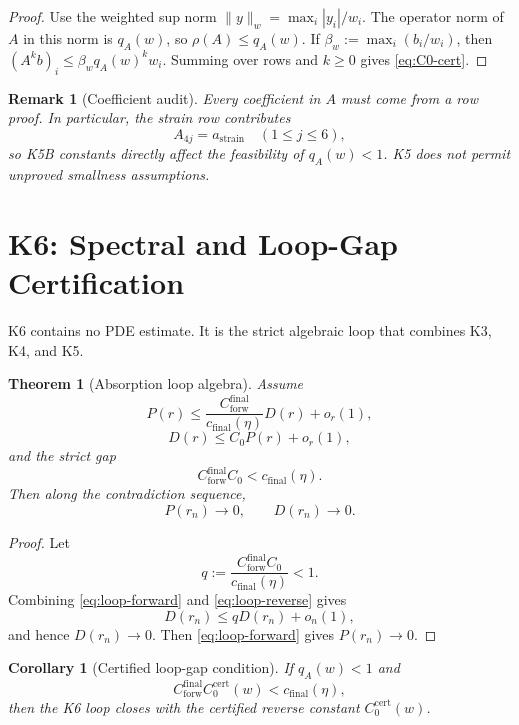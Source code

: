 \documentclass[11pt]{article}
\newtheorem{theorem}{Theorem}
\newtheorem{corollary}{Corollary}
\newtheorem{remark}{Remark}
\begin{document}
\begin{proof}
Use the weighted sup norm \(\|y\|_w=\max_i |y_i|/w_i\).  The operator norm of
\(A\) in this norm is \(q_A(w)\), so \(\rho(A)\le q_A(w)\).  If
\(\beta_w:=\max_i(b_i/w_i)\), then \((A^kb)_i\le \beta_w q_A(w)^kw_i\).
Summing over rows and \(k\ge0\) gives \eqref{eq:C0-cert}.
\end{proof}

\begin{remark}[Coefficient audit]
Every coefficient in \(A\) must come from a row proof.  In particular, the
strain row contributes
\[
A_{4j}=a_{\mathrm{strain}}\quad(1\le j\le6),
\]
so K5B constants directly affect the feasibility of \(q_A(w)<1\).  K5 does not
permit unproved smallness assumptions.
\end{remark}

\clearpage
\section{K6: Spectral and Loop-Gap Certification}
\label{sec:K6}

K6 contains no PDE estimate.  It is the strict algebraic loop that combines K3,
K4, and K5.

\begin{theorem}[Absorption loop algebra]
\label{thm:K6}
Assume
\begin{equation}
\label{eq:loop-forward}
P(r)\le
\frac{C_{\mathrm{forw}}^{\mathrm{final}}}{c_{\mathrm{final}}(\eta)}
D(r)+o_r(1),
\end{equation}
\begin{equation}
\label{eq:loop-reverse}
D(r)\le C_0P(r)+o_r(1),
\end{equation}
and the strict gap
\begin{equation}
\label{eq:loop-gap}
C_{\mathrm{forw}}^{\mathrm{final}}C_0<c_{\mathrm{final}}(\eta).
\end{equation}
Then along the contradiction sequence,
\[
P(r_n)\to0,\qquad D(r_n)\to0.
\]
\end{theorem}

\begin{proof}
Let
\[
q:=\frac{C_{\mathrm{forw}}^{\mathrm{final}}C_0}
{c_{\mathrm{final}}(\eta)}<1.
\]
Combining \eqref{eq:loop-forward} and \eqref{eq:loop-reverse} gives
\[
D(r_n)\le qD(r_n)+o_n(1),
\]
and hence \(D(r_n)\to0\).  Then \eqref{eq:loop-forward} gives
\(P(r_n)\to0\).
\end{proof}

\begin{corollary}[Certified loop-gap condition]
\label{cor:cert-loop}
If \(q_A(w)<1\) and
\begin{equation}
\label{eq:cert-loop-gap}
C_{\mathrm{forw}}^{\mathrm{final}}C_0^{\mathrm{cert}}(w)
<
c_{\mathrm{final}}(\eta),
\end{equation}
then the K6 loop closes with the certified reverse constant
\(C_0^{\mathrm{cert}}(w)\).
\end{corollary}
\end{document}
